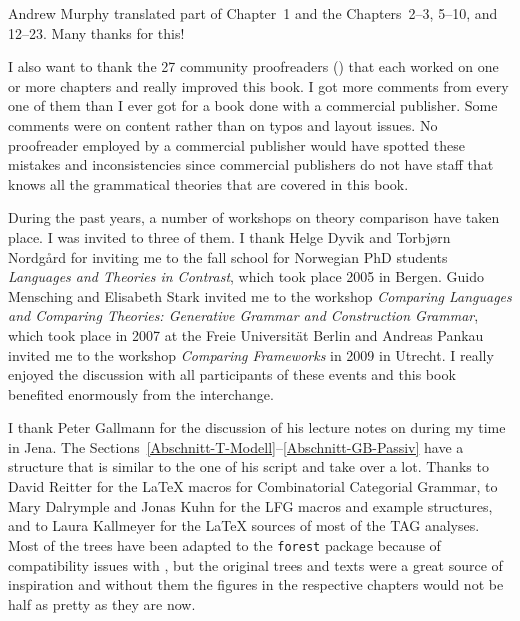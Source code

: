 Andrew Murphy translated part of Chapter~1 and the Chapters~2--3, 5--10, and 12--23. Many thanks for this!

I also want to thank the 27 community proofreaders (\makeatletter\@proofreader\makeatother) that each worked on one or more chapters and
really improved this book. I got more comments from every one of them than I ever got for a book
done with a commercial publisher. Some comments were on content rather than on typos and layout
issues. No proofreader employed by a commercial publisher would have spotted these mistakes and
inconsistencies since commercial publishers do not have staff that knows all the grammatical
theories that are covered in this book. 

During the past years, a number of workshops on theory comparison have taken place. I was invited to three of them.
I thank Helge Dyvik and Torbjørn Nordgård for inviting me to the fall school for Norwegian PhD
students  \emph{Languages and Theories in Contrast}, which took place 2005 in Bergen. Guido Mensching and Elisabeth
Stark invited me to the workshop \emph{Comparing Languages and Comparing Theories:
  Generative Grammar and Construction Grammar}, which took place in 2007 at the Freie Universität
Berlin and Andreas Pankau invited me to the workshop \emph{Comparing
  Frameworks} in 2009 in Utrecht. I really enjoyed the discussion with all participants of these
events and this book benefited enormously from the interchange.

I thank Peter Gallmann for the discussion of his lecture notes on \gb
during my time in Jena. The Sections~\ref{Abschnitt-T-Modell}--\ref{Abschnitt-GB-Passiv} have a
structure that is similar to the one of his script and take over a lot. Thanks to David Reitter for
the \LaTeX{} macros for Combinatorial Categorial Grammar, to Mary Dalrymple and Jonas Kuhn for the LFG
macros and example structures, and to Laura Kallmeyer for the \LaTeX{} sources of most of the TAG
analyses. Most of the trees have been adapted to the \texttt{forest} package because of compatibility issues
with \XeLaTeX, but the original trees and texts were a great source of inspiration and without them
the figures in the respective chapters would not be half as pretty as they are now.

